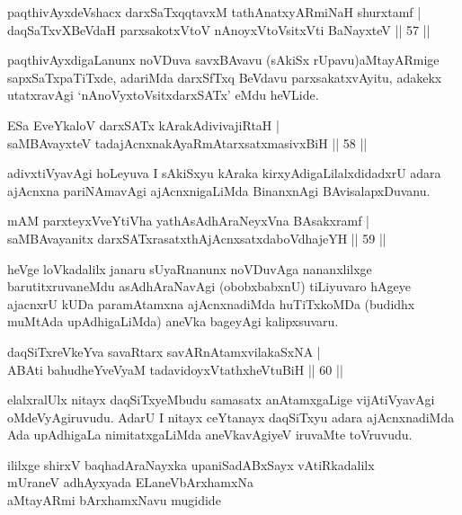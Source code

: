 \begin{shl}
paqthivAyxdeVshacx darxSaTxqqtavxM tathA\s natxyARmiNaH shurxtamf |\\
daqSaTxvXBeVdaH parxsakotxV\s toV nAnoyxV\s toV\s sitxVti BaNayxteV \hfill || 57 ||
\end{shl}

\begin{artha}
paqthivAyxdigaLanunx noVDuva savxBAvavu (sAkiSx rUpavu)\break aMtayARmige sapxSaTxpaTiTxde, adariMda darxSfTxq BeVdavu parxsakatxvAyitu, adakekx utatxravAgi `nAnoVyxtoV\s sitxdarxSATx' eMdu heVLide.
\end{artha}


\begin{shl}
ESa EveYkaloV darxSATx kArakAdivivajiRtaH |\\
saMBAvayxteV tadajAcnxnakAyaRmAtarxsatxmasivxBiH \hfill || 58 ||
\end{shl}

\begin{artha}
adivxtiVyavAgi hoLeyuva I sAkiSxyu kAraka kirxyAdigaLilalxdidadxrU adara ajAcnxna pariNAmavAgi ajAcnxnigaLiMda BinanxnAgi BAvisalapxDuvanu.
\end{artha}

\begin{shl}
mAM parxteyxVveYtiVha yathA\s sAdhAraNeyxVna BAsakxramf |\\
saMBAvayanitx darxSATxrasatxthA\s jAcnxsatxdaboVdhajeYH \hfill || 59 ||
\end{shl}

\begin{artha}
heVge loVkadalilx janaru sUyaRnanunx noVDuvAga nananxlilxge barutitxruvaneMdu asAdhAraNavAgi (obobxbabxnU) tiLiyuvaro hAgeye ajacnxrU kUDa paramAtamxna ajAcnxnadiMda huTiTxkoMDa (budidhx muMtAda upAdhigaLiMda) aneVka bageyAgi kalipxsuvaru.
\end{artha}%


\begin{shl}
daqSiTxreVkeYva savaRtarx savARnAtamxvilakaSxNA |\\
ABAti bahudheYveVyaM tadavidoyxVtathxheVtuBiH \hfill || 60 ||
\end{shl}

\begin{artha}
elalxralUlx nitayx daqSiTxyeMbudu samasatx anAtamxgaLige vijAtiVyavAgi oMdeVyAgiruvudu. AdarU I nitayx ceYtanayx daqSiTxyu adara ajAcnxnadiMda Ada upAdhigaLa nimitatxgaLiMda aneVkavAgiyeV iruvaMte toVruvudu.
\end{artha}

\begin{center}
ililxge shirxV baqhadAraNayxka upaniSadABxSayx vAtiRkadalilx\\ mUraneV adhAyxyada ELaneVbArxhamxNa\\ aMtayARmi bArxhamxNavu mugidide
\end{center}
